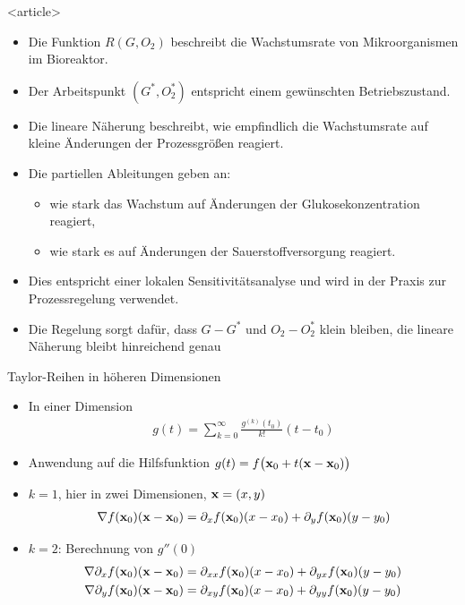 \begin{onlyenv}<article>
\begin{itemize}
\item Die Funktion \(R(G,O_2)\) beschreibt die Wachstumsrate von Mikroorganismen im Bioreaktor.
\item Der Arbeitspunkt \((G^*, O_2^*)\) entspricht einem gewünschten Betriebszustand.
\item Die lineare Näherung beschreibt, wie empfindlich die Wachstumsrate auf kleine Änderungen der Prozessgrößen reagiert.
\item Die partiellen Ableitungen geben an:
\begin{itemize}
\item wie stark das Wachstum auf Änderungen der Glukosekonzentration reagiert,
\item wie stark es auf Änderungen der Sauerstoffversorgung reagiert.
\end{itemize}
\item Dies entspricht einer lokalen Sensitivitätsanalyse und wird in der Praxis zur Prozessregelung verwendet.
\item Die Regelung sorgt dafür, dass \(G-G^*\) und \(O_2 - O_2^*\) klein bleiben, die lineare Näherung bleibt hinreichend genau
\end{itemize}
\end{onlyenv}

\begin{frame}{Taylor-Reihen in höheren Dimensionen}
  \begin{itemize}
  \item In einer Dimension
    \begin{gather*}
      g(t) = \sum_{k=0}^\infty \frac{g^{(k)}(t_0)}{k!} (t-t_0)
    \end{gather*}
  \item Anwendung auf die Hilfsfunktion $g(t) = f\bigl(\mathbf{x}_0+t(\mathbf{x}-\mathbf{x}_0)\bigr)$
  \item $k=1$, hier in zwei Dimensionen, $\mathbf{x} = (x,y)$
    \begin{gather*}
      \nabla f(\mathbf{x}_0) (\mathbf{x}-\mathbf{x}_0) = \partial_xf(\mathbf{x}_0)(x-x_0) + \partial_yf(\mathbf{x}_0)(y-y_0)
    \end{gather*}
  \item<2-> $k=2$: Berechnung von $g''(0)$
    \begin{align*}
      \nabla \partial_xf(\mathbf{x}_0)(\mathbf{x}-\mathbf{x}_0)
      &= \partial_{xx}f(\mathbf{x}_0)(x-x_0) + \partial_{yx}f(\mathbf{x}_0)(y-y_0)\\
      \nabla \partial_yf(\mathbf{x}_0)(\mathbf{x}-\mathbf{x}_0)
      &= \partial_{xy}f(\mathbf{x}_0)(x-x_0) + \partial_{yy}f(\mathbf{x}_0)(y-y_0)
    \end{align*}
  \end{itemize}
\end{frame}

